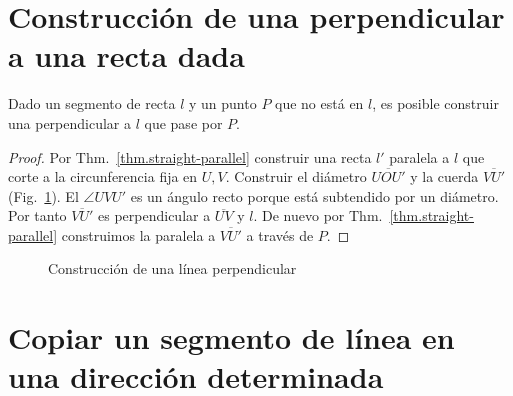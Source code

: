 \section{Construcción de una perpendicular a una recta dada}\label{s.perp}

\begin{theorem}\label{thm.straight-perp}
Dado un segmento de recta $l$ y un punto $P$ que no está en $l$, es posible construir una perpendicular a $l$ que pase por $P$.
\end{theorem}

\begin{proof}
Por Thm.~\ref{thm.straight-parallel} construir una recta $l'$ paralela a $l$ que corte a la circunferencia fija en $U,V$. Construir el diámetro $\overline{UOU'}$ y la cuerda $\overline{VU'}$ (Fig.~\ref{f.se-perp}). El $\angle UVU'$ es un ángulo recto porque está subtendido por un diámetro. Por tanto $\overline{VU'}$ es perpendicular a $\overline{UV}$ y $l$. De nuevo por Thm.~\ref{thm.straight-parallel} construimos la paralela a $\overline{VU'}$ a través de $P$.
\end{proof}

\begin{figure}[htb]
\begin{center}
\end{center}
\caption{Construcción de una línea perpendicular}\label{f.se-perp}
\end{figure}

\section{Copiar un segmento de línea en una dirección determinada}\label{s.copy}

